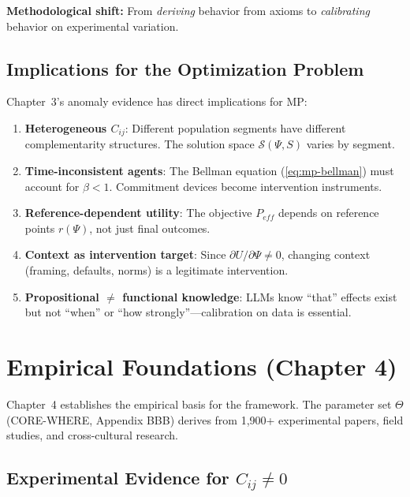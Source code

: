 \textbf{Methodological shift:} From \textit{deriving} behavior from axioms to
\textit{calibrating} behavior on experimental variation.

\subsection{Implications for the Optimization Problem}

Chapter~3's anomaly evidence has direct implications for MP:

\begin{enumerate}
\item \textbf{Heterogeneous $C_{ij}$}: Different population segments have different
      complementarity structures. The solution space $\mathcal{S}(\Psi, S)$ varies by segment.

\item \textbf{Time-inconsistent agents}: The Bellman equation (\ref{eq:mp-bellman})
      must account for $\beta < 1$. Commitment devices become intervention instruments.

\item \textbf{Reference-dependent utility}: The objective $P_{eff}$ depends on
      reference points $r(\Psi)$, not just final outcomes.

\item \textbf{Context as intervention target}: Since $\partial U/\partial \Psi \neq 0$,
      changing context (framing, defaults, norms) is a legitimate intervention.

\item \textbf{Propositional $\neq$ functional knowledge}: LLMs know ``that'' effects
      exist but not ``when'' or ``how strongly''---calibration on data is essential.
\end{enumerate}

\section{Empirical Foundations (Chapter 4)}
\label{sec:mp-empirical}

Chapter~4 establishes the empirical basis for the framework. The parameter set $\Theta$
(CORE-WHERE, Appendix BBB) derives from 1,900+ experimental papers, field studies,
and cross-cultural research.

\subsection{Experimental Evidence for $C_{ij} \neq 0$}

